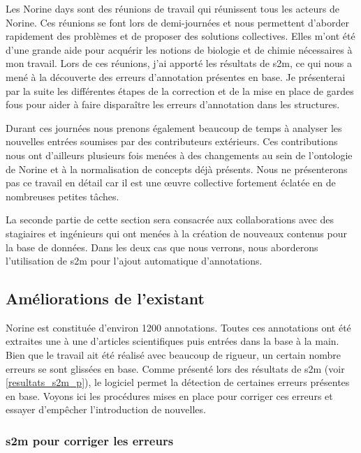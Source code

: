 Les Norine days sont des réunions de travail qui réunissent tous les acteurs de Norine.
Ces réunions se font lors de demi-journées et nous permettent d'aborder rapidement des problèmes et de proposer des solutions collectives.
Elles m'ont été d'une grande aide pour acquérir les notions de biologie et de chimie nécessaires à mon travail.
Lors de ces réunions, j'ai apporté les résultats de s2m, ce qui nous a mené à la découverte des erreurs d'annotation présentes en base.
Je présenterai par la suite les différentes étapes de la correction et de la mise en place de gardes fous pour aider à faire disparaître les erreurs d'annotation dans les structures.

Durant ces journées nous prenons également beaucoup de temps à analyser les nouvelles entrées soumises par des contributeurs extérieurs.
Ces contributions nous ont d'ailleurs plusieurs fois menées à des changements au sein de l'ontologie de Norine et à la normalisation de concepts déjà présents.
Nous ne présenterons pas ce travail en détail car il est une œuvre collective fortement éclatée en de nombreuses petites tâches.

La seconde partie de cette section sera consacrée aux collaborations avec des stagiaires et ingénieurs qui ont menées à la création de nouveaux contenus pour la base de données.
Dans les deux cas que nous verrons, nous aborderons l'utilisation de s2m pour l'ajout automatique d'annotations.


\subsection{Améliorations de l'existant}

Norine est constituée d'environ 1200 annotations.
Toutes ces annotations ont été extraites une à une d'articles scientifiques puis entrées dans la base à la main.
Bien que le travail ait été réalisé avec beaucoup de rigueur, un certain nombre erreurs se sont glissées en base.
Comme présenté lors des résultats de s2m (voir \ref{resultats_s2m_p}), le logiciel permet la détection de certaines erreurs présentes en base.
Voyons ici les procédures mises en place pour corriger ces erreurs et essayer d'empêcher l'introduction de nouvelles.


\subsubsection{s2m pour corriger les erreurs}

